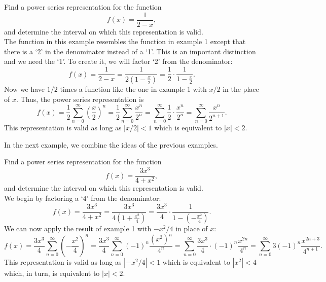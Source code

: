\documentclass{ximera}
\begin{document}
\begin{example}[example 6]
Find a power series representation for the function
\[
f(x) = \frac{1}{2-x},
\]
and determine the interval on which this representation is valid.\\
The function in this example resembles the function in example 1 except that there is a `2' in the denominator instead of a `1'.
This is an important distinction and we need the `1'. To create it, we will factor `2' from the denominator:
\[
f(x) = \frac{1}{2 -x} = \frac{1}{2(1 - \frac{x}{2})} = \frac12 \cdot \frac{1}{1 - \frac{x}{2}}.
\]
Now we have $1/2$ times a function like the one in example 1 with $x/2$ in the place of $x$.
Thus, the power series representation is
\[
f(x) = \frac12 \sum_{n=0}^\infty \left(\frac{x}{2}\right)^n  = \frac12 \sum_{n=0}^\infty \frac{x^n}{2^n}
=  \sum_{n=0}^\infty \frac12 \cdot \frac{x^n}{2^n} =  \sum_{n=0}^\infty \frac{x^n}{2^{n+1}}.
\]
This representation is valid as long as $|x/2| < 1$ which is equivalent to $|x| < 2$.

\end{example}

In the next example, we combine the ideas of the previous examples.


\begin{example}[example 7]
Find a power series representation for the function
\[
f(x) = \frac{3x^3}{4 + x^2},
\]
and determine the interval on which this representation is valid.\\
We begin by factoring a `4' from the denominator:
\[
f(x) = \frac{3x^3}{4+x^2} = \frac{3x^3}{4(1 + \frac{x^2}{4})} = \frac{3x^3}{4} \cdot \frac{1}{1 - (-\frac{x^2}{4})}.
\]
We can now apply the result of example 1 with $-x^2 /4$ in place of $x$:
\[
f(x) = \frac{3x^3}{4} \sum_{n=0}^\infty \left(-\frac{x^2}{4}\right)^n = \frac{3x^3}{4} \sum_{n=0}^\infty (-1)^n \frac{(x^2)^n}{4^n}
=  \sum_{n=0}^\infty \frac{3x^3}{4} \cdot (-1)^n \frac{x^{2n}}{4^n} =  \sum_{n=0}^\infty 3 (-1)^n \frac{x^{2n+3}}{4^{n+1}}. 
\]
This representation is valid as long as $|-x^2/4| < 1$ which is equivalent to $|x^2| < 4$ which, in turn, is equivalent to $|x| < 2$.

\end{example}



\begin{center}
\begin{foldable}
\end{foldable}
\end{center}
\end{document}

